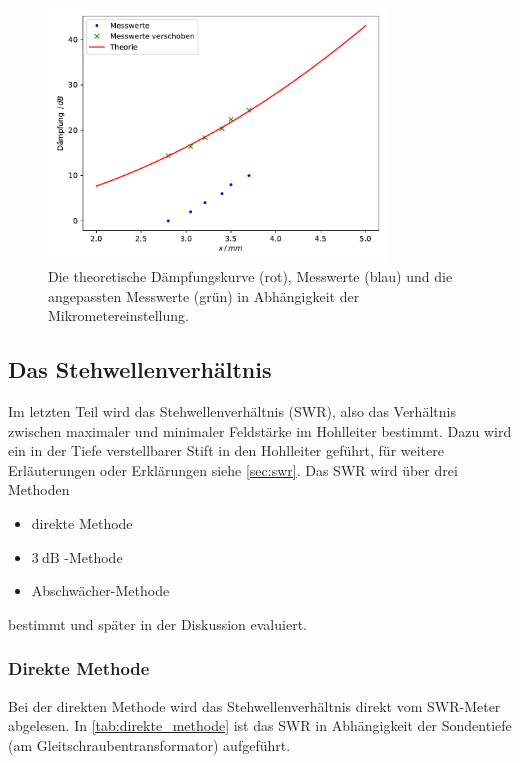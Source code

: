 \begin{figure}
    \centering
    \includegraphics[width=0.8\textwidth]{content/data/daempfung.pdf}
    \caption{Die theoretische Dämpfungskurve (rot), Messwerte (blau) und die angepassten Messwerte (grün) in Abhängigkeit der Mikrometereinstellung.}
    \label{fig:daempfung}
\end{figure}
\FloatBarrier

\subsection{Das Stehwellenverhältnis}
\label{sec:aus_stehwellen}
Im letzten Teil wird das Stehwellenverhältnis (SWR), also das Verhältnis zwischen maximaler und minimaler Feldstärke im Hohlleiter bestimmt.
Dazu wird ein in der Tiefe verstellbarer Stift in den Hohlleiter geführt, für weitere Erläuterungen oder Erklärungen siehe \autoref{sec:swr}.
Das SWR wird über drei Methoden
\begin{itemize}
    \item direkte Methode
    \item $\SI{3}{\dB}$ -Methode
    \item Abschwächer-Methode
\end{itemize}
bestimmt und später in der Diskussion evaluiert.

\subsubsection{Direkte Methode}
Bei der direkten Methode wird das Stehwellenverhältnis direkt vom SWR-Meter abgelesen.
In \autoref{tab:direkte_methode} ist das SWR in Abhängigkeit der Sondentiefe (am Gleitschraubentransformator) aufgeführt.

